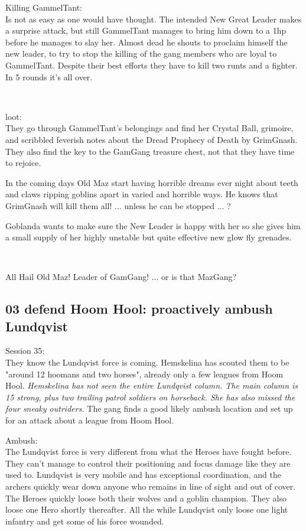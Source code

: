 Killing GammelTant:\\
Is not as easy as one would have thought. The intended New Great Leader makes a surprise attack, but still GammelTant manages to bring him down to a 1hp before he manages to slay her. Almost dead he shouts to proclaim himself the new leader, to try to stop the killing of the gang members who are loyal to GammelTant. Despite their best efforts they have to kill two runts and a fighter.\\
In 5 rounds it's all over.

\

loot:\\
They go through GammelTant's belongings and find her Crystal Ball, grimoire, and scribbled feverish notes about the Dread Prophecy of Death by GrimGnash. They also find the key to the GamGang treasure chest, not that they have time to rejoice.

In the coming days Old Maz start having horrible dreams ever night about teeth and claws ripping goblins apart in varied and horrible ways. He knows that GrimGnash will kill them all! ... unless he can be stopped ... ?

Goblanda wants to make sure the New Leader is happy with her so she gives him a small supply of her highly unstable but quite effective new glow fly grenades.

\

\noindent All Hail Old Maz! Leader of GamGang! ... or is that MazGang?


\subsection*{03 defend Hoom Hool: proactively ambush Lundqvist}

\forceindent Session 35:\\                                              %
They know the Lundqvist force is coming. Hemskelina has scouted them to be "around 12 hoomans and two horses", already only a few leagues from Hoom Hool.
\emph{Hemskelina has not seen the entire Lundqvist column. The main column is 15 strong, plus two trailing patrol soldiers on horseback. She has also missed the four sneaky outriders.}
The gang finds a good likely ambush location and set up for an attack about a league from Hoom Hool.

Ambush:\\
The Lundqvist force is very different from what the Heroes have fought before. They can't manage to control their positioning and focus damage like they are used to. Lundqvist is very mobile and has exceptional coordination, and the archers quickly wear down anyone who remains in line of sight and out of cover. The Heroes quickly loose both their wolves and a goblin champion. They also loose one Hero shortly thereafter. All the while Lundqvist only loose one light infantry and get some of his force wounded.

